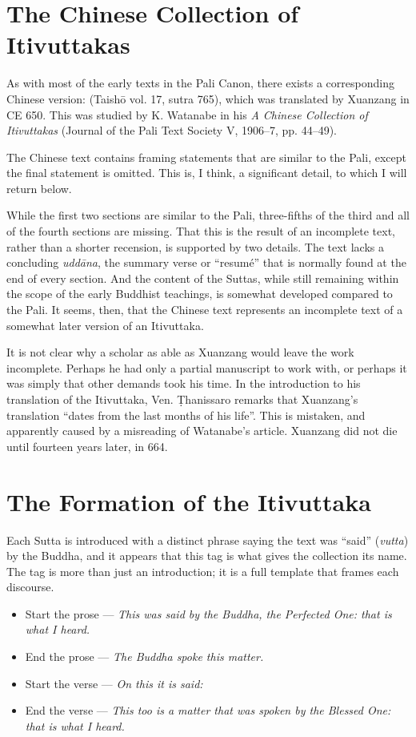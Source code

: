 \documentclass[12pt,openany]{book}%
\newcommand*{\langlzh}[1]{\cjk{#1}\normalfont}%
\begin{document}
\section*{The Chinese Collection of Itivuttakas}

As with most of the early texts in the Pali Canon, there exists a corresponding Chinese version: \langlzh{本事經} (Taishō vol. 17, sutra 765), which was translated by Xuanzang in CE 650. This was studied by K. Watanabe in his \textit{A Chinese Collection of Itivuttakas} (Journal of the Pali Text Society V, 1906–7, pp. 44–49).

The Chinese text contains framing statements that are similar to the Pali, except the final statement is omitted. This is, I think, a significant detail, to which I will return below.

While the first two sections are similar to the Pali, three-fifths of the third and all of the fourth sections are missing. That this is the result of an incomplete text, rather than a shorter recension, is supported by two details. The text lacks a concluding \emph{\textsanskrit{uddāna}}, the summary verse or “resumé” that is normally found at the end of every section. And the content of the Suttas, while still remaining within the scope of the early Buddhist teachings, is somewhat developed compared to the Pali. It seems, then, that the Chinese text represents an incomplete text of a somewhat later version of an Itivuttaka.

It is not clear why a scholar as able as Xuanzang would leave the work incomplete. Perhaps he had only a partial manuscript to work with, or perhaps it was simply that other demands took his time. In the introduction to his translation of the Itivuttaka, Ven. Ṭhanissaro remarks that Xuanzang’s translation “dates from the last months of his life”. This is mistaken, and apparently caused by a misreading of Watanabe’s article. Xuanzang did not die until fourteen years later, in 664.

\section*{The Formation of the Itivuttaka}

Each Sutta is introduced with a distinct phrase saying the text was “said” (\emph{vutta}) by the Buddha, and it appears that this tag is what gives the collection its name. The tag is more than just an introduction; it is a full template that frames each discourse.

\begin{itemize}%
\item Start the prose — \emph{This was said by the Buddha, the Perfected One: that is what I heard.}%
\item End the prose — \emph{The Buddha spoke this matter.}%
\item Start the verse — \emph{On this it is said:}%
\item End the verse — \emph{This too is a matter that was spoken by the Blessed One: that is what I heard.}%
\end{itemize}
\end{document}
